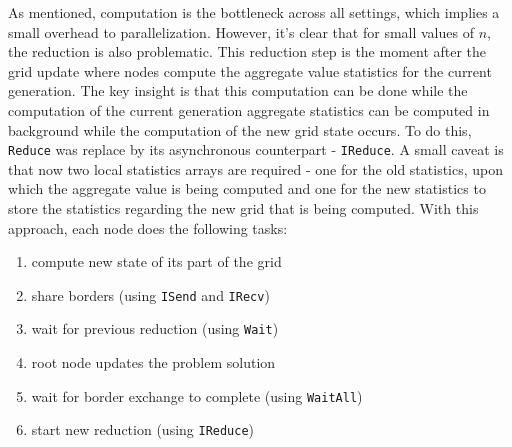 \documentclass{article}
\begin{document}
As mentioned, computation is the bottleneck across all settings, which implies a small
overhead to parallelization. However, it's
clear that for small values of $n$, the reduction is also problematic. This reduction
step is the moment after the grid update where nodes compute the aggregate value
statistics for the current generation.
The key insight is that this computation can be done while the computation of the
current generation aggregate statistics can be computed in background while
the computation of the new grid state occurs. To do this, \texttt{Reduce} was 
replace by its asynchronous counterpart - \texttt{IReduce}. A small caveat is that
now two local statistics arrays are required - one for the old statistics, upon which
the aggregate value is being computed and one for the new statistics to store
the statistics regarding the new grid that is being computed. With this approach,
each node does the following tasks:

\begin{enumerate}
	\itemsep -0.2em
	\item compute new state of its part of the grid
	\item share borders (using \texttt{ISend} and \texttt{IRecv})
	\item wait for previous reduction (using \texttt{Wait})
	\item root node updates the problem solution
	\item wait for border exchange to complete (using \texttt{WaitAll})
	\item start new reduction (using \texttt{IReduce})
\end{enumerate}

\end{document}
